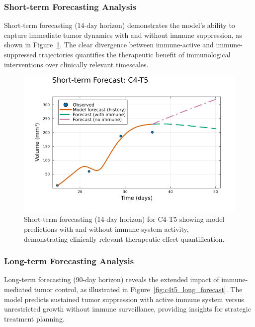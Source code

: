 \documentclass{juliacon}
\begin{document}
\subsubsection{Short-term Forecasting Analysis}

Short-term forecasting (14-day horizon) demonstrates the model's ability to capture immediate tumor dynamics with and without immune suppression, as shown in Figure~\ref{fig:c4t5_short_forecast}. The clear divergence between immune-active and immune-suppressed trajectories quantifies the therapeutic benefit of immunological interventions over clinically relevant timescales.

\begin{figure}[H]\centering
\includegraphics[width=\linewidth]{forecast_short.png}
\caption{Short-term forecasting (14-day horizon) for C4-T5 showing model predictions with and without immune system activity, demonstrating clinically relevant therapeutic effect quantification.}
\label{fig:c4t5_short_forecast}
\end{figure}

\subsubsection{Long-term Forecasting Analysis}

Long-term forecasting (90-day horizon) reveals the extended impact of immune-mediated tumor control, as illustrated in Figure~\ref{fig:c4t5_long_forecast}. The model predicts sustained tumor suppression with active immune system versus unrestricted growth without immune surveillance, providing insights for strategic treatment planning.
\end{document}
